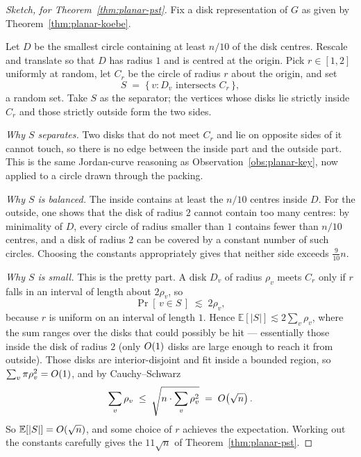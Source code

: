 \begin{proof}[Sketch, for Theorem~\ref{thm:planar-pst}]
Fix a disk representation of $G$ as given by Theorem~\ref{thm:planar-koebe}.

Let $D$ be the smallest circle containing at least $n/10$ of the disk centres.
Rescale and translate so that $D$ has radius $1$ and is centred at the origin.
Pick $r \in [1,2]$ uniformly at random, let $C_r$ be the circle of radius $r$
about the origin, and set
\[
  S \;=\; \{\, v : D_v \text{ intersects } C_r \,\} ,
\]
a random set. Take $S$ as the separator; the vertices whose disks lie strictly
inside $C_r$ and those strictly outside form the two sides.

\emph{Why $S$ separates.} Two disks that do not meet $C_r$ and lie on opposite
sides of it cannot touch, so there is no edge between the inside part and the
outside part. This is the same Jordan-curve reasoning as
Observation~\ref{obs:planar-key}, now applied to a circle drawn through the packing.

\emph{Why $S$ is balanced.} The inside contains at least the $n/10$ centres
inside $D$. For the outside, one shows that the disk of radius $2$ cannot
contain too many centres: by minimality of $D$, every circle of radius smaller
than $1$ contains fewer than $n/10$ centres, and a disk of radius $2$ can be
covered by a constant number of such circles. Choosing the constants
appropriately gives that neither side exceeds $\tfrac{9}{10}n$.

\emph{Why $S$ is small.} This is the pretty part. A disk $D_v$ of radius $\rho_v$
meets $C_r$ only if $r$ falls in an interval of length about $2\rho_v$, so
\[
  \Pr[\,v \in S\,] \;\lesssim\; 2\rho_v ,
\]
because $r$ is uniform on an interval of length $1$. Hence
$\mathbb{E}[|S|] \lesssim 2\sum_v \rho_v$, where the sum ranges over the disks
that could possibly be hit --- essentially those inside the disk of radius
$2$ (only $O\!\left(1\right)$ disks are large enough to reach it from outside). Those
disks are interior-disjoint and fit inside a bounded region, so
$\sum_v \pi\rho_v^2 = O\!\left(1\right)$, and by Cauchy--Schwarz
\[
  \sum_{v} \rho_v \;\le\; \sqrt{ n \cdot \sum_v \rho_v^2 } \;=\; O\!\left(\sqrt n\right) .
\]
So $\mathbb{E}[|S|] = O\!\left(\sqrt{n}\right)$, and some choice of $r$ achieves the
expectation. Working out the constants carefully gives the $11\sqrt n$ of
Theorem~\ref{thm:planar-pst}.
\end{proof}

